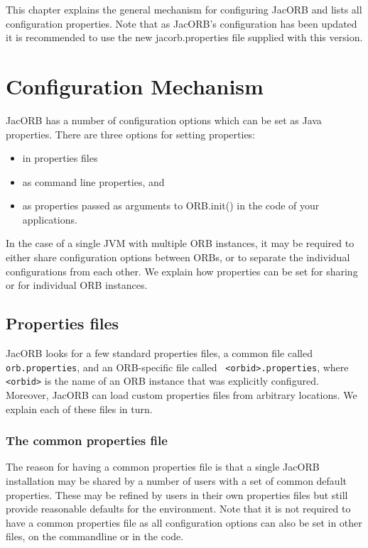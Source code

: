 ﻿%

This chapter explains the general mechanism for configuring JacORB
and lists all configuration properties. Note that as JacORB's
configuration has been updated it is recommended to use the new
jacorb.properties file supplied with this version.

\section{Configuration Mechanism}

JacORB has a number of configuration options which can be set as Java
properties. There are three options for setting properties:

\begin{itemize}
\item in properties files
\item as command line properties, and
\item as properties passed as arguments to ORB.init() in the code of your
  applications.
\end{itemize}

In the case of a single JVM with multiple ORB instances, it may be
required to either share configuration options between ORBs, or to
separate the individual configurations from each other. We explain how
properties can be set for sharing or for individual ORB instances.

\subsection{Properties files}

JacORB looks for a few standard properties files, a common file called
{\tt orb.properties}, and an ORB-specific file called {\tt
  <orbid>.properties}, where {\tt <orbid>} is the name of an ORB
instance that was explicitly configured. Moreover, JacORB can load
custom properties files from arbitrary locations. We explain each of
these files in turn.

\subsubsection{The common properties file}

The reason for having a common properties file is that a single JacORB
installation may be shared by a number of users with a set of common
default properties. These may be refined by users in their own
properties files but still provide reasonable defaults for the
environment. Note that it is not required to have a common properties
file as all configuration options can also be set in other files, on
the commandline or in the code.

